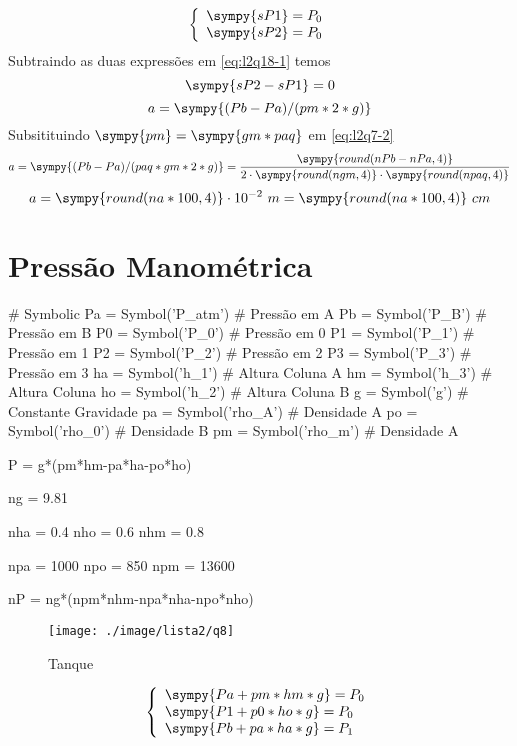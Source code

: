 \documentclass[a4paper,twocolumn,11pt]{article}
\newcommand{\npy}[1]{\sympy{round(n#1,4)}}
\begin{document}
\begin{equation}\label{eq:l2q7-1}
\left\{
\begin{array}{l}
\sympy{sP1} = P_0\\
\sympy{sP2} = P_0\\
\end{array}
\right.
\end{equation}
Subtraindo as duas expressões em \eqref{eq:l2q18-1} temos
$$\sympy{sP2-sP1} = 0$$
\begin{equation}\label{eq:l2q7-2}
a = \sympy{(Pb-Pa)/(pm*2*g)}
\end{equation}
Subsitituindo $\sympy{pm} = \sympy{gm*paq}$ em \eqref{eq:l2q7-2}
$$
a = \sympy{(Pb-Pa)/(paq*gm*2*g)} = \frac{\npy{Pb-nPa}}{2\cdot\npy{gm}\cdot\npy{paq}}
$$
\begin{equation}\label{eq:l2q18-3}
a = \npy{a*100}\cdot 10^{-2}\ m = \npy{a*100}\ cm
\end{equation}

\section{Pressão Manométrica} %
\begin{sympycode}
# Symbolic
Pa = Symbol('P_atm') # Pressão em A
Pb = Symbol('P_B') # Pressão em B
P0 = Symbol('P_0') # Pressão em 0
P1 = Symbol('P_1') # Pressão em 1
P2 = Symbol('P_2') # Pressão em 2
P3 = Symbol('P_3') # Pressão em 3
ha = Symbol('h_1') # Altura Coluna A
hm = Symbol('h_3') # Altura Coluna 
ho = Symbol('h_2') # Altura Coluna B
g = Symbol('g') # Constante Gravidade
pa = Symbol('rho_A') # Densidade A
po = Symbol('rho_0') # Densidade B
pm = Symbol('rho_m') # Densidade A

P = g*(pm*hm-pa*ha-po*ho)

ng = 9.81

nha = 0.4
nho = 0.6
nhm = 0.8

npa = 1000
npo = 850
npm = 13600

nP = ng*(npm*nhm-npa*nha-npo*nho)
\end{sympycode}

\begin{figure}[H]
\centering
\label{fig:l2q8}
\texttt{[image: ./image/lista2/q8]}
\caption{Tanque}
\end{figure}

\begin{equation}\label{eq:l2q8-1}
\left\{
\begin{array}{l}
\sympy{Pa + pm*hm*g} = P_0\\
\sympy{P1 + p0*ho*g} = P_0\\
\sympy{Pb + pa*ha*g} = P_1
\end{array}
\right.
\end{equation}
\end{document}
